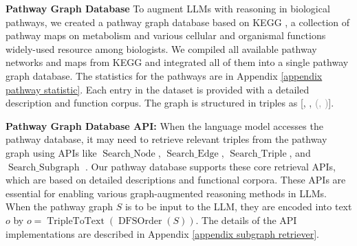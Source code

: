 

\textbf{Pathway Graph Database} To augment LLMs with reasoning in biological pathways, we created a pathway graph database based on KEGG \citep{kanehisa2000kegg}, a collection of pathway maps on metabolism and various cellular and organismal functions widely-used resource among biologists. {We compiled all available pathway networks and maps from KEGG and integrated all of them into a single pathway graph database}. The statistics for the pathways are in Appendix \ref{appendix pathway statistic}. Each entry in the dataset is provided with a detailed description and function corpus. The graph is structured in triples as [, , \textcolor{gray}{(, )}].






\textbf{Pathway Graph Database API:} When the language model accesses the pathway database, it may need to retrieve relevant triples from the pathway graph using APIs like $\operatorname{Search\_Node}$, $\operatorname{Search\_Edge}$, $\operatorname{Search\_Triple}$, and $\operatorname{Search\_Subgraph}$ \citep{sun2023think,li2023chain}. Our pathway database supports these core retrieval APIs, which are based on detailed descriptions and functional corpora. These APIs are essential for enabling various graph-augmented reasoning methods in LLMs. When the pathway graph $S$ is to be input to the LLM, they are encoded into text $o$ by $o=\operatorname{TripleToText}(\operatorname{DFSOrder}(S))$. The details of the API implementations are described in Appendix \ref{appendix subgraph retriever}.


